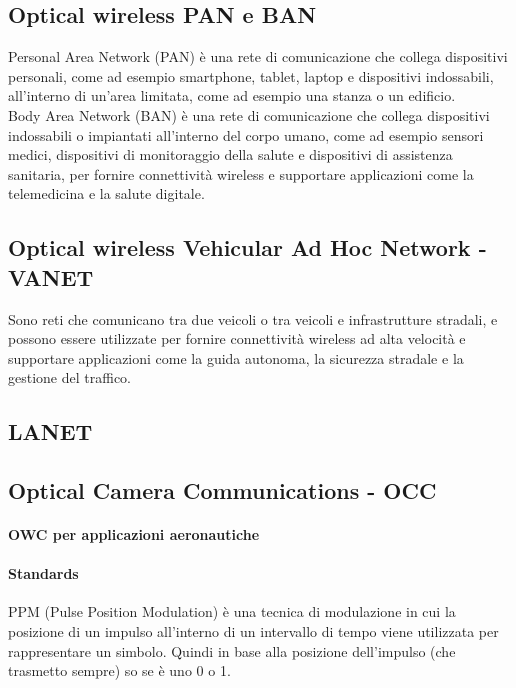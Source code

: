 \subsection{Optical wireless PAN e BAN}

Personal Area Network (PAN) è una rete di comunicazione che collega dispositivi personali, come ad esempio smartphone, tablet, laptop e dispositivi indossabili, all'interno di un'area limitata, come ad esempio una stanza o un edificio.\\
Body Area Network (BAN) è una rete di comunicazione che collega dispositivi indossabili o impiantati all'interno del corpo umano, come ad esempio sensori medici, dispositivi di monitoraggio della salute e dispositivi di assistenza sanitaria, per fornire connettività wireless e supportare applicazioni come la telemedicina e la salute digitale.\\
\subsection{Optical wireless Vehicular Ad Hoc Network - VANET}
Sono reti che comunicano tra due veicoli o tra veicoli e infrastrutture stradali, e possono essere utilizzate per fornire connettività wireless ad alta velocità e supportare applicazioni come la guida autonoma, la sicurezza stradale e la gestione del traffico.\\

\subsection{ LANET}

\subsection{Optical Camera Communications - OCC}

\paragraph{OWC per applicazioni aeronautiche}

\paragraph{Standards}
PPM (Pulse Position Modulation) è una tecnica di modulazione in cui la posizione di un impulso all'interno di un intervallo di tempo viene utilizzata per rappresentare un simbolo. Quindi in base alla posizione dell'impulso (che trasmetto sempre) so se è uno 0 o 1.\\

